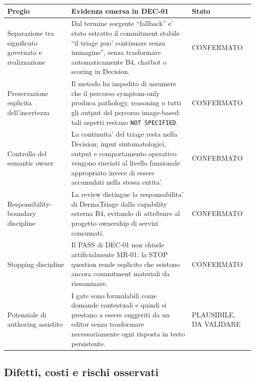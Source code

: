 \documentclass[11pt,a4paper]{article}
\begin{document}
\begin{tabularx}{\textwidth}{L{42mm}Y L{25mm}}
\toprule
\textbf{Pregio} & \textbf{Evidenza emersa in DEC-01} & \textbf{Stato} \\
\midrule
Separazione tra significato governato e realizzazione & Dal termine sorgente ``fallback'' e' stato estratto il commitment stabile ``il triage puo' continuare senza immagine'', senza trasformare automaticamente B4, chatbot o scoring in Decision. & CONFERMATO \\
Preservazione esplicita dell'incertezza & Il metodo ha impedito di assumere che il percorso symptom-only produca pathology, reasoning o tutti gli output del percorso image-based: tali aspetti restano \texttt{NOT SPECIFIED}. & CONFERMATO \\
Controllo del semantic owner & La continuita' del triage resta nella Decision; input sintomatologici, output e comportamento operativo vengono rinviati al livello funzionale appropriato invece di essere accumulati nella stessa entita'. & CONFERMATO \\
Responsibility-boundary discipline & La review distingue la responsabilita' di DermaTriage dalla capability esterna B4, evitando di attribuire al progetto ownership di servizi consumati. & CONFERMATO \\
Stopping discipline & Il PASS di DEC-01 non chiude artificialmente MR-01: la STOP question rende esplicito che esistono ancora commitment materiali da riesaminare. & CONFERMATO \\
Potenziale di authoring assistito & I gate sono formulabili come domande contestuali e quindi si prestano a essere suggeriti da un editor senza trasformare necessariamente ogni risposta in testo persistente. & PLAUSIBILE, DA VALIDARE \\
\bottomrule
\end{tabularx}

\subsection{Difetti, costi e rischi osservati}
\end{document}
